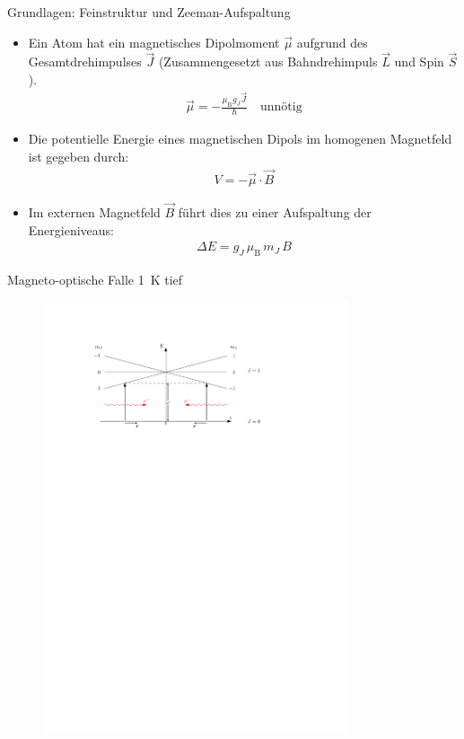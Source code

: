 \documentclass[12pt,xcolor=dvipsnames]{beamer}
\begin{document}
\begin{frame}{Grundlagen: Feinstruktur und Zeeman-Aufspaltung}
	\begin{itemize}
		\item Ein Atom hat ein magnetisches Dipolmoment $\vec{\mu}$ aufgrund des Gesamtdrehimpulses $\vec{J}$ (Zusammengesetzt aus Bahndrehimpuls $\vec{L}$ und Spin $\vec{S}$).
		\begin{align}
		\vec{\mu} = - \frac{\mu_\mathrm{B} g_J \vec{J}}{\hbar} \quad \text{unnötig}
		\end{align}
		\item Die potentielle Energie eines magnetischen Dipols im homogenen Magnetfeld ist gegeben durch:
		\begin{align}
		V = - \vec{\mu} \cdot \vec{B}
		\end{align}
		\item Im externen Magnetfeld $\vec{B}$ führt dies zu einer Aufspaltung der Energieniveaus:
		\begin{align}
		\Delta E = g_J \, \mu_\mathrm{B} \, m_J \, B
		\end{align}
	\end{itemize}
\end{frame}

\begin{frame}{Magneto-optische Falle}
\SI{1}{K} tief

\begin{figure}[h]
	\centering
	\includegraphics[width=0.8\textwidth]{./figures/mot.pdf}
\end{figure}
\end{frame}
\end{document}
